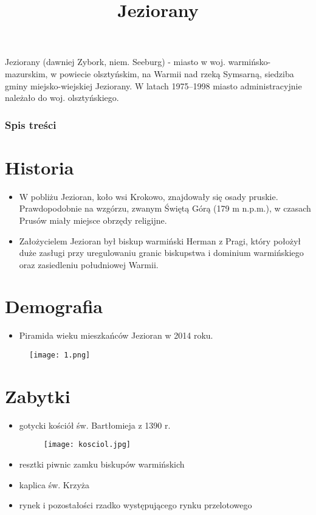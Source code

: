 \documentclass[]{beamer}
\title{Jeziorany}
\date{}
\begin{document}
\frame
{
\maketitle
}

\begin{frame}
Jeziorany (dawniej Zybork, niem. Seeburg) - miasto w woj. warmińsko-mazurskim, w powiecie olsztyńskim, na Warmii nad rzeką Symsarną, siedziba gminy miejsko-wiejskiej Jeziorany. W latach 1975–1998 miasto administracyjnie należało do woj. olsztyńskiego.
\end{frame}

\begin{frame}
\frametitle{Spis treści}
\tableofcontents
\end{frame}


\section{Historia}
\begin{frame}
\begin{itemize}
\item W pobliżu Jezioran, koło wsi Krokowo, znajdowały się osady pruskie. Prawdopodobnie na wzgórzu, zwanym Świętą Górą (179 m n.p.m.), w czasach Prusów miały miejsce obrzędy religijne.
\pause
\item Założycielem Jezioran był biskup warmiński Herman z Pragi, który położył duże zasługi przy uregulowaniu granic biskupstwa i dominium warmińskiego oraz zasiedleniu południowej Warmii.
\end{itemize}
\end{frame}

\section{Demografia}
\begin{frame}
\begin{itemize}
\item Piramida wieku mieszkańców Jezioran w 2014 roku.
\end{itemize}
\begin{figure}
\centering
\texttt{[image: 1.png]}
\end{figure}
\end{frame}

\section{Zabytki}
\begin{frame}
\begin{itemize}
\item gotycki kościół św. Bartłomieja z 1390 r.
\pause
\begin{figure}
\centering
\texttt{[image: kosciol.jpg]}
\end{figure}
\pause
\item resztki piwnic zamku biskupów warmińskich
\pause
\item kaplica św. Krzyża 
\pause 
\item rynek i pozostałości rzadko występującego rynku przelotowego
\end{itemize}
\end{frame}
\end{document}
